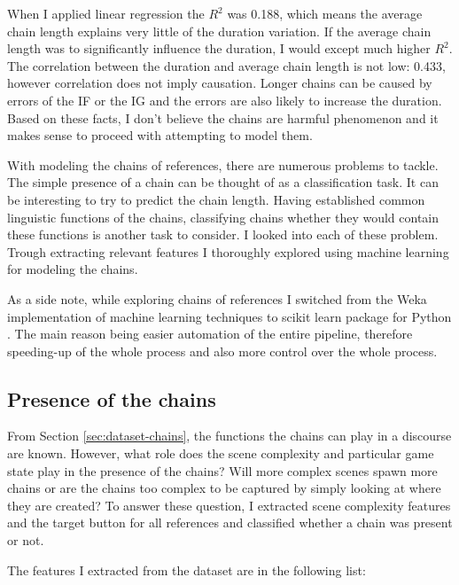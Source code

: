 When I applied linear regression the $R^2$ was 0.188, which means the average chain length explains very little of the duration variation. If the average chain length was to significantly influence the duration, I would except much higher $R^2$. The correlation between the duration and average chain length is not low: 0.433, however correlation does not imply causation. Longer chains can be caused by errors of the IF or the IG and the errors are also likely to increase the duration. Based on these facts, I don't believe the chains are harmful phenomenon and it makes sense to proceed with attempting to model them. 

With modeling the chains of references, there are numerous problems to tackle. The simple presence of a chain can be thought of as a classification task. It can be interesting to try to predict the chain length. Having established common linguistic functions of the chains, classifying chains whether they would contain these functions is another task to consider. I looked into each of these problem. Trough extracting relevant features I thoroughly explored using machine learning for modeling the chains.

As a side note, while exploring chains of references I switched from the Weka implementation of machine learning techniques \citep{hall2009weka} to scikit learn package for Python \citep{scikit-learn}. The main reason being easier automation of the entire pipeline, therefore speeding-up of the whole process and also more control over the whole process.

\subsection{Presence of the chains}
From Section \ref{sec:dataset-chains}, the functions the chains can play in a discourse are known. However, what role does the scene complexity and particular game state play in the presence of the chains? Will more complex scenes spawn more chains or are the chains too complex to be captured by simply looking at where they are created? To answer these question, I extracted scene complexity features and the target button for all references and classified whether a chain was present or not.

The features I extracted from the dataset are in the following list:

